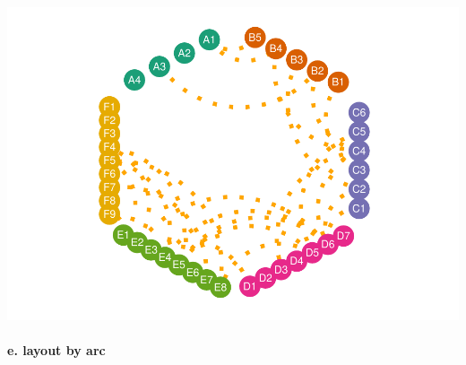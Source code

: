 \documentclass[
]{article}
\let\oldparagraph\paragraph
\renewcommand{\paragraph}[1]{\oldparagraph{#1}\mbox{}}
\begin{document}
\includegraphics{ReadMe_files/figure-latex/unnamed-chunk-13-1.pdf}

\hypertarget{e.-layout-by-arc}{%
\paragraph{e. layout by arc}\label{e.-layout-by-arc}}
\end{document}
